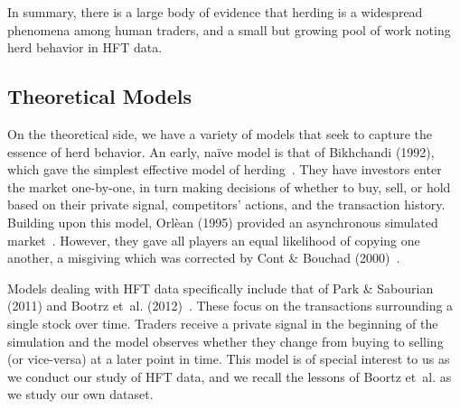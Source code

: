 In summary, there is a large body of evidence that herding is a widespread phenomena among human traders, and a small but growing pool of work noting herd behavior in HFT data.

\subsection{Theoretical Models}

On the theoretical side, we have a variety of models that seek to capture the essence of herd behavior.
An early, na\"ive model is that of Bikhchandi (1992), which gave the simplest effective model of herding~\cite{bikhchandani1992theory}.
They have investors enter the market one-by-one, in turn making decisions of whether to buy, sell, or hold based on their private signal, competitors' actions, and the transaction history.
Building upon this model, Orl\`{e}an (1995) provided an asynchronous simulated market~\cite{orlean1995}.
However, they gave all players an equal likelihood of copying one another, a misgiving which was corrected by Cont \& Bouchad (2000)~\cite{cont}.

Models dealing with HFT data specifically include that of Park \& Sabourian (2011) and Bootrz et~al. (2012)~\cite{park2011herding,boortz}.
These focus on the transactions surrounding a single stock over time.
Traders receive a private signal in the beginning of the simulation and the model observes whether they change from buying to selling (or vice-versa) at a later point in time.
This model is of special interest to us as we conduct our study of HFT data, and we recall the lessons of Boortz et~al. as we study our own dataset.

